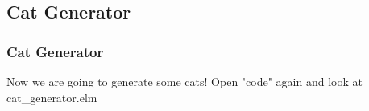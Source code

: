 \subsection{Cat Generator}
    \begin{frame}
        \frametitle{Cat Generator}
        Now we are going to generate some cats!
        Open "code" again and look at cat\_generator.elm
    \end{frame}